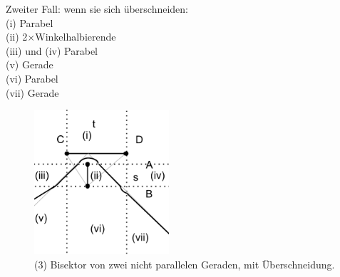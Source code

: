 Zweiter Fall: wenn sie sich überschneiden:\\
(i) Parabel\\
(ii) 2$\times$Winkelhalbierende\\
(iii) und (iv) Parabel\\
(v) Gerade\\
(vi) Parabel\\
(vii) Gerade\\

\begin{figure}[h!]
\begin{center}
\includegraphics[width=5cm]{img/ssnpin.png}
\end{center}
\caption{(3) Bisektor von zwei nicht parallelen Geraden, mit Überschneidung.}
\label{fig:a5}
\end{figure}